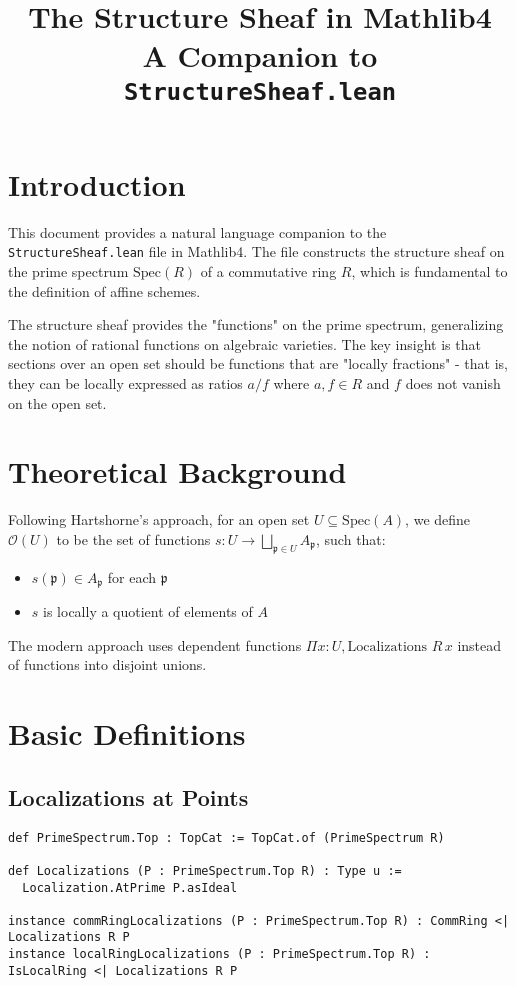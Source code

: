 \documentclass{article}
\title{The Structure Sheaf in Mathlib4\\
\large A Companion to \texttt{StructureSheaf.lean}}
\author{}
\date{}
\theoremstyle{definition}
\begin{document}
\maketitle

\section{Introduction}

This document provides a natural language companion to the \texttt{StructureSheaf.lean} file in Mathlib4. The file constructs the structure sheaf on the prime spectrum $\mathrm{Spec}(R)$ of a commutative ring $R$, which is fundamental to the definition of affine schemes.

The structure sheaf provides the "functions" on the prime spectrum, generalizing the notion of rational functions on algebraic varieties. The key insight is that sections over an open set should be functions that are "locally fractions" - that is, they can be locally expressed as ratios $a/f$ where $a, f \in R$ and $f$ does not vanish on the open set.

\section{Theoretical Background}

Following Hartshorne's approach, for an open set $U \subseteq \mathrm{Spec}(A)$, we define $\mathcal{O}(U)$ to be the set of functions $s : U \to \bigsqcup_{\mathfrak{p} \in U} A_\mathfrak{p}$, such that:
\begin{itemize}
\item $s(\mathfrak{p}) \in A_\mathfrak{p}$ for each $\mathfrak{p}$
\item $s$ is locally a quotient of elements of $A$
\end{itemize}

The modern approach uses dependent functions $\Pi x : U, \text{Localizations } R \, x$ instead of functions into disjoint unions.

\section{Basic Definitions}

\subsection{Localizations at Points}

\begin{lstlisting}
def PrimeSpectrum.Top : TopCat := TopCat.of (PrimeSpectrum R)

def Localizations (P : PrimeSpectrum.Top R) : Type u :=
  Localization.AtPrime P.asIdeal

instance commRingLocalizations (P : PrimeSpectrum.Top R) : CommRing <| Localizations R P
instance localRingLocalizations (P : PrimeSpectrum.Top R) : IsLocalRing <| Localizations R P
\end{lstlisting}
\end{document}
